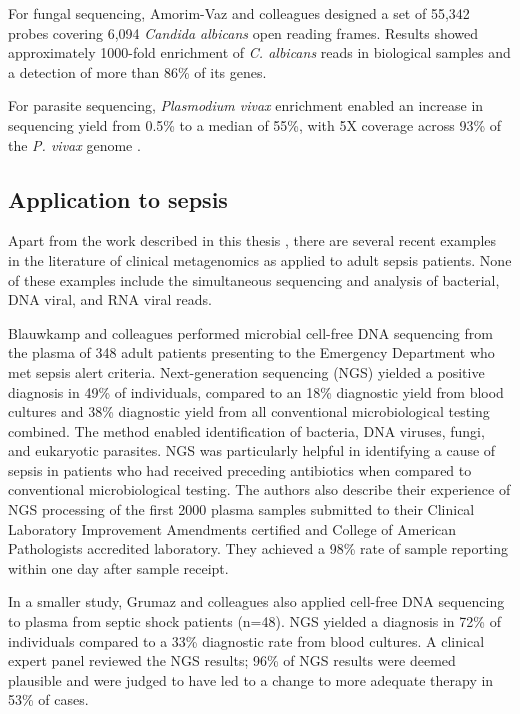 For fungal sequencing, Amorim-Vaz and colleagues \parencite{Amorim-Vaz2015} designed a set of 55,342 probes covering 6,094 \textit{Candida albicans} open reading frames. Results showed approximately 1000-fold enrichment of \textit{C. albicans} reads in biological samples and a detection of more than 86\% of its genes. 

For parasite sequencing, \textit{Plasmodium vivax} enrichment enabled an increase in sequencing yield from 0.5\% to a median of 55\%, with 5X coverage across 93\% of the \textit{P. vivax} genome \parencite{Bright2012}.

\subsection{Application to sepsis}
Apart from the work described in this thesis \parencite{Goh2019}, there are several recent examples in the literature of clinical metagenomics as applied to adult sepsis patients. None of these examples include the simultaneous sequencing and analysis of bacterial, DNA viral, and RNA viral reads. 

Blauwkamp and colleagues \parencite{Blauwkamp2019} performed microbial cell-free DNA sequencing from the plasma of 348 adult patients presenting to the Emergency Department who met sepsis alert criteria. Next-generation sequencing (NGS) yielded a positive diagnosis in 49\% of individuals, compared to an 18\% diagnostic yield from blood cultures and 38\% diagnostic yield from all conventional microbiological testing combined. The method enabled identification of bacteria, DNA viruses, fungi, and eukaryotic parasites. NGS was particularly helpful in identifying a cause of sepsis in patients who had received preceding antibiotics when compared to conventional microbiological testing. The authors also describe their experience of NGS processing of the first 2000 plasma samples submitted to their Clinical Laboratory Improvement Amendments certified and College of American Pathologists accredited laboratory. They achieved a 98\% rate of sample reporting within one day after sample receipt.

In a smaller study, Grumaz and colleagues \parencite{Grumaz2019} also applied cell-free DNA sequencing to plasma from septic shock patients (n=48). NGS yielded a diagnosis in 72\% of individuals compared to a 33\% diagnostic rate from blood cultures. A clinical expert panel reviewed the NGS results; 96\% of NGS results were deemed plausible and were judged to have led to a change to more adequate therapy in 53\% of cases.


